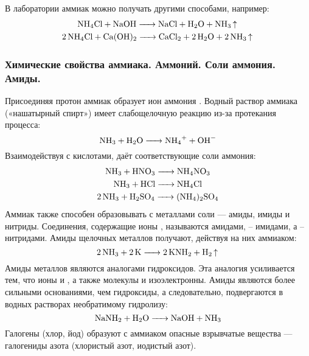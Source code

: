      В лаборатории аммиак можно получать другими способами, например:
     \begin{gather*}
         \ce{NH4Cl + NaOH -> NaCl + H2O + NH3 ^}\\
         \ce{2NH4Cl + Ca(OH)2 -> CaCl2 + 2H2O + 2NH3 ^}
     \end{gather*}
     \subsubsection{Химические свойства аммиака. Аммоний. Соли аммония. Амиды.}
     Присоединяя протон аммиак образует ион аммония . Водный раствор аммиака («нашатырный спирт») имеет слабощелочную реакцию из-за протекания процесса:
     \begin{equation*}
         \ce{NH3 + H2O -> NH4^{+} + OH^{-}}
     \end{equation*}
     Взаимодействуя с кислотами, даёт соответствующие соли аммония:
    \begin{gather*}
        \ce{NH3 + HNO3 -> NH4NO3}\\
        \ce{NH3 + HCl -> NH4Cl}\\
        \ce{2NH3 + H2SO4 -> (NH4)2SO4}
    \end{gather*}
    Аммиак также способен образовывать с металлами соли — амиды, имиды и нитриды. Соединения, содержащие ионы , называются амидами,  -- имидами, а  -- нитридами. Амиды щелочных металлов получают, действуя на них аммиаком:
    \begin{equation*}
        \ce{2NH3 + 2K -> 2KNH2 + H2 ^}
    \end{equation*}
    Амиды металлов являются аналогами гидроксидов. Эта аналогия усиливается тем, что ионы  и , а также молекулы  и  изоэлектронны. Амиды являются более сильными основаниями, чем гидроксиды, а следовательно, подвергаются в водных растворах необратимому гидролизу:
    \begin{equation*}
        \ce{NaNH2 + H2O -> NaOH + NH3}
    \end{equation*}
    Галогены (хлор, йод) образуют с аммиаком опасные взрывчатые вещества — галогениды азота (хлористый азот, иодистый азот).
